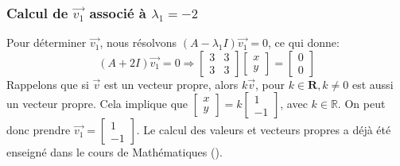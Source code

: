             \subsubsection{Calcul de $\overrightarrow{v_1}$ associé à $\lambda_1=-2$}
                Pour déterminer $\overrightarrow{v_1}$, nous résolvons $(A - \lambda_1 I) \overrightarrow{v_1}=0$, ce qui donne:
                \begin{equation}
                    (A + 2 I) \overrightarrow{v_1}=0 \Rightarrow
                    \begin{bmatrix} 3 & 3 \\ 3 & 3 \end{bmatrix} 
                    \begin{bmatrix} x \\ y \end{bmatrix}=
                    \begin{bmatrix} 0 \\ 0 \end{bmatrix}
                \end{equation}
                Rappelons que si $\overrightarrow{v}$ est un vecteur propre, alors $k\overrightarrow{v}$, pour $k \in \mathbf{R}, k\neq 0$ est aussi un vecteur propre. Cela implique que $\begin{bmatrix} x \\ y \end{bmatrix}=k \begin{bmatrix} 1 \\ -1 \end{bmatrix}$, avec $k \in \mathbb{R}$. On peut donc prendre $\overrightarrow{v_1}=\begin{bmatrix} 1 \\ -1 \end{bmatrix}$.
                Le calcul des valeurs et vecteurs propres a déjà été enseigné dans le cours de Mathématiques (\cite{mathf117}).
                
